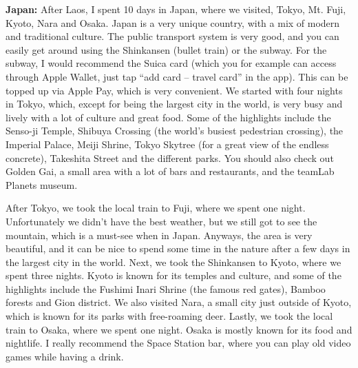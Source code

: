 \textbf{Japan:} After Laos, I spent 10 days in Japan, where we visited, Tokyo, Mt. Fuji, Kyoto, Nara and Osaka. Japan is a very unique country, with a mix of modern and traditional culture. The public transport system is very good, and you can easily get around using the Shinkansen (bullet train) or the subway. For the subway, I would recommend the Suica card (which you for example can access through Apple Wallet, just tap ``add card -- travel card'' in the app). This can be topped up via Apple Pay, which is very convenient. We started with four nights in Tokyo, which, except for being the largest city in the world, is very busy and lively with a lot of culture and great food. Some of the highlights include the Senso-ji Temple, Shibuya Crossing (the world's busiest pedestrian crossing), the Imperial Palace, Meiji Shrine, Tokyo Skytree (for a great view of the endless concrete), Takeshita Street and the different parks. You should also check out Golden Gai, a small area with a lot of bars and restaurants, and the teamLab Planets museum.


After Tokyo, we took the local train to Fuji, where we spent one night. Unfortunately we didn't have the best weather, but we still got to see the mountain, which is a must-see when in Japan. Anyways, the area is very beautiful, and it can be nice to spend some time in the nature after a few days in the largest city in the world. Next, we took the Shinkansen to Kyoto, where we spent three nights. Kyoto is known for its temples and culture, and some of the highlights include the Fushimi Inari Shrine (the famous red gates), Bamboo forests and Gion district. We also visited Nara, a small city just outside of Kyoto, which is known for its parks with free-roaming deer. Lastly, we took the local train to Osaka, where we spent one night. Osaka is mostly known for its food and nightlife. I really recommend the Space Station bar, where you can play old video games while having a drink.

